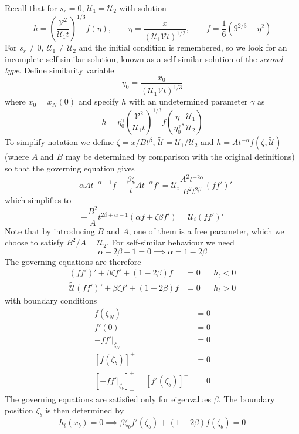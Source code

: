 \documentclass{jknotes}
\newcommand{\dif}[1]{\left[#1\right]^+_-}
\begin{document}
Recall that for $s_r = 0$, $\mathcal{U}_1 = \mathcal{U}_2$ with solution
\begin{equation}
	h = \left( \frac{\mathcal{V}^2}{\mathcal{U}_1 t}\right)^{1/3} f(\eta),
	\hspace{2em} \eta = \frac{x}{(\mathcal{U}_1\mathcal{V}t)^{1/2}},
	\hspace{2em} f = \frac{1}{6}\left( 9^{2/3} - \eta^2\right)
\end{equation}
For $s_r \ne 0$, $\mathcal{U}_1 \ne \mathcal{U}_2$ and the initial condition
is remembered, so we look for an incomplete self-similar solution, known as a
self-similar solution of the \emph{second type}. Define similarity variable
\begin{equation}
	\eta_0 = \frac{x_0}{(\mathcal{U}_1\mathcal{V}t)^{1/3}}
\end{equation}
where $x_0 = x_N(0)$ and specify $h$ with an undetermined parameter $\gamma$ as
\begin{equation}
	h = \eta_0^\gamma \left( \frac{\mathcal{V}^2}{\mathcal{U}_1t}\right)^{1/3}
	f\left(\frac{\eta}{\eta_0^\gamma},\frac{\mathcal{U}_1}{\mathcal{U}_2}\right)
\end{equation}
To simplify notation we define $\zeta = x/Bt^\beta$, $\tilde{\mathcal{U}} =
\mathcal{U}_1/\mathcal{U}_2$ and $h = A t^{-\alpha} f(\zeta,
\tilde{\mathcal{U}})$ (where $A$ and $B$ may be determined by comparison with
the original definitions) so that the governing equation gives
\begin{equation}
	-\alpha A t^{-\alpha-1} f - \frac{\beta \zeta}{t}At^{-\alpha} f' =
	\mathcal{U}_i \frac{A^2 t^{-2\alpha}}{B^2 t^{2\beta}} (ff')'
\end{equation}
which simplifies to
\begin{equation}
	-\frac{B^2}{A} t^{2\beta + \alpha -1} (\alpha f + \zeta \beta f') =
	\mathcal{U}_i(ff')'
\end{equation}
Note that by introducing $B$ and $A$, one of them is a free parameter, which
we choose to satisfy $B^2/A = \mathcal{U}_2$. For self-similar behaviour we
need
\begin{equation}
	\alpha + 2\beta -1 = 0 \implies \alpha = 1 - 2\beta
\end{equation}
The governing equations are therefore
\begin{align}
	(ff')' + \beta \zeta f' + (1-2\beta) f &= 0 && h_t < 0 \\
	\tilde{\mathcal{U}}(ff')' + \beta \zeta f' + (1-2\beta) f &= 0 && h_t > 0
\end{align}
with boundary conditions
\begin{align}
	f(\zeta_N) &= 0 \\
	f'(0) &= 0 \\
	-\left.ff'\right|_{\zeta_N} &= 0 \\
	\dif{f(\zeta_b)} &= 0 \\
	\dif{-\left.ff'\right|_{\zeta_b}} = \dif{f'(\zeta_b)} &= 0 
\end{align}
The governing equations are satisfied only for eigenvalues $\beta$. The
boundary position $\zeta_b$ is then determined by
\begin{equation}
	h_t(x_b) = 0 \implies \beta \zeta_b f'(\zeta_b) + (1-2\beta) f(\zeta_b) =
	0
\end{equation}
\end{document}

